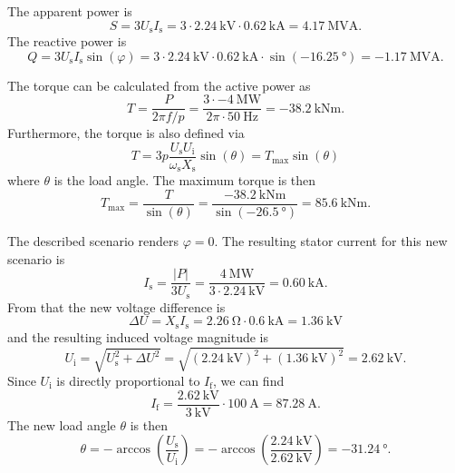 \begin{solutionblock}
	The apparent power is
	$$S = 3 U_\mathrm{s} I_\mathrm{s} = 3 \cdot \SI{2.24}{\kilo\volt} \cdot \SI{0.62}{\kilo\ampere} = \SI{4.17}{\mega\volt\ampere}.$$
	The reactive power is
	$$Q = 3 U_\mathrm{s} I_\mathrm{s} \sin(\varphi) = 3 \cdot \SI{2.24}{\kilo\volt} \cdot \SI{0.62}{\kilo\ampere} \cdot \sin(\SI{-16.25}{\degree}) = \SI{-1.17}{\mega\volt\ampere}.$$
\end{solutionblock}


\begin{solutionblock}
	The torque can be calculated from the active power as
	$$T = \frac{P}{2\pi f/p} = \frac{3\cdot\SI{-4}{\mega\watt}}{2\pi \cdot \SI{50}{\hertz}} = \SI{-38.2}{\kilo\newton\meter}.$$
	Furthermore, the torque is also defined via
	$$
		T = 3 p \frac{U_\mathrm{s}U_\mathrm{i}}{\omega_\mathrm{s} X_\mathrm{s}}\sin(\theta) = T_\mathrm{max} \sin(\theta)
	$$
	where $\theta$ is the load angle. The maximum torque is then
	$$
		T_\mathrm{max} = \frac{T}{\sin(\theta)} = \frac{\SI{-38.2}{\kilo\newton\meter}}{\sin(\SI{-26.5}{\degree})} = \SI{85.6}{\kilo\newton\meter}.
	$$
\end{solutionblock}


\begin{solutionblock}
	The described scenario renders $\varphi=0$. The resulting stator current for this new scenario is
	$$
		I_\mathrm{s} = \frac{|P|}{3 U_\mathrm{s}} = \frac{\SI{4}{\mega\watt}}{3 \cdot \SI{2.24}{\kilo\volt}} = \SI{0.60}{\kilo\ampere}.$$
	From that the new voltage difference is
	$$
		\Delta U = X_\mathrm{s} I_\mathrm{s} = \SI{2.26}{\ohm} \cdot \SI{0.6}{\kilo\ampere} = \SI{1.36}{\kilo\volt}
	$$
	and the resulting induced voltage magnitude is
	$$
		U_\mathrm{i} = \sqrt{U_\mathrm{s}^2 + \Delta U^2} = \sqrt{(\SI{2.24}{\kilo\volt})^2 + (\SI{1.36}{\kilo\volt})^2} = \SI{2.62}{\kilo\volt}.
	$$
	Since $U_\mathrm{i}$ is directly proportional to $I_\mathrm{f}$, we can find
	$$
		I_\mathrm{f} = \frac{\SI{2.62}{\kilo\volt}}{\SI{3}{\kilo\volt}} \cdot\SI{100}{\ampere} = \SI{87.28}{\ampere}.
	$$
	The new load angle $\theta$ is then
	$$
		\theta = -\arccos\left(\frac{U_\mathrm{s}}{U_\mathrm{i}}\right) = -\arccos\left(\frac{\SI{2.24}{\kilo\volt}}{\SI{2.62}{\kilo\volt}}\right) = \SI{-31.24}{\degree}.
	$$
\end{solutionblock}

